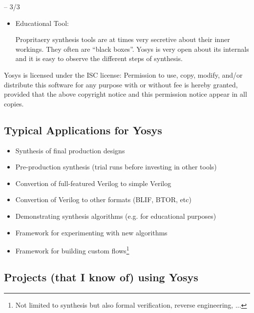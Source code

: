 \begin{frame}{\subsecname{} -- 3/3}
\begin{itemize}
\item Educational Tool: \smallskip\par
Propritaery synthesis tools are at times very secretive about their inner
workings. They often are ``black boxes''. Yosys is very open about its
internals and it is easy to observe the different steps of synthesis.
\end{itemize}

\bigskip
\begin{block}{Yosys is licensed under the ISC license:}
Permission to use, copy, modify, and/or distribute this software for any
purpose with or without fee is hereby granted, provided that the above
copyright notice and this permission notice appear in all copies.
\end{block}
\end{frame}


\subsection{Typical Applications for Yosys}

\begin{frame}{\subsecname}
\begin{itemize}
\item Synthesis of final production designs
\item Pre-production synthesis (trial runs before investing in other tools)
\item Convertion of full-featured Verilog to simple Verilog
\item Convertion of Verilog to other formats (BLIF, BTOR, etc)
\item Demonstrating synthesis algorithms (e.g. for educational purposes)
\item Framework for experimenting with new algorithms
\item Framework for building custom flows\footnote[frame]{Not limited to synthesis
but also formal verification, reverse engineering, ...}
\end{itemize}
\end{frame}


\subsection{Projects (that I know of) using Yosys}

